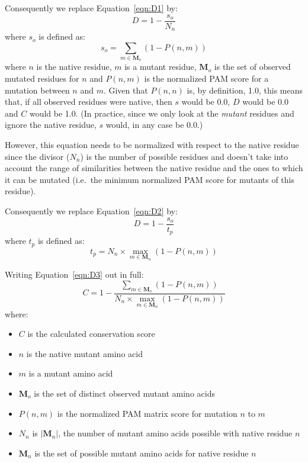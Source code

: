 \documentclass[a4paper]{article}
\begin{document}
Consequently we replace Equation~\ref{eqn:D1} by:
\begin{equation}
  D = 1 - \frac{s_o}{N_n}
  \label{eqn:D2}
\end{equation}
where $s_o$ is defined as:
\begin{equation}
  s_o = \sum_{m \in \mathbf M_o} (1 - P(n,m))
\end{equation}
where $n$ is the native residue, $m$ is a mutant residue, $\mathbf M_o$ is
the set of observed mutated residues for $n$ and $P(n,m)$ is the
normalized PAM score for a mutation between $n$ and $m$. Given that
$P(n,n)$ is, by definition, 1.0, this means that, if all observed
residues were native, then $s$ would be 0.0, $D$ would be 0.0 and $C$
would be 1.0. (In practice, since we only look at the \emph{mutant}
residues and ignore the native residue, $s$ would, in any case be $0.0$.)

However, this equation needs to be normalized with respect to the native
residue since the divisor ($N_n$) is the number of possible residues and
doesn't take into account the range of similarities between the native
residue and the ones to which it can be mutated (i.e.\ the minimum
normalized PAM score for mutants of this residue).

Consequently we replace Equation~\ref{eqn:D2} by:
\begin{equation}
  D = 1 - \frac{s_o}{t_p}
  \label{eqn:D3}
\end{equation}
where $t_p$ is defined as:
\begin{equation}
  t_p = N_n \times \max_{m \in \mathbf M_n} (1 - P(n,m))
\end{equation}

Writing Equation~\ref{eqn:D3} out in full:
\begin{equation}
  C = 1 - \frac{\sum_{m \in \mathbf M_o} (1 - P(n,m))}{N_n \times \max_{m \in \mathbf M_n} (1 - P(n,m))}
\end{equation}
where:
\begin{itemize}
\item $C$ is the calculated conservation score
\item $n$ is the native mutant amino acid
\item $m$ is a mutant amino acid
\item $\mathbf M_o$ is the set of distinct observed mutant amino acids
\item $P(n,m)$ is the normalized PAM matrix score for mutation $n$ to $m$
\item $N_n$ is $|\mathbf M_n|$, the number of mutant amino acids possible with native residue $n$
\item $\mathbf M_n$ is the set of possible mutant amino acids for native residue $n$
\end{itemize}
\end{document}

